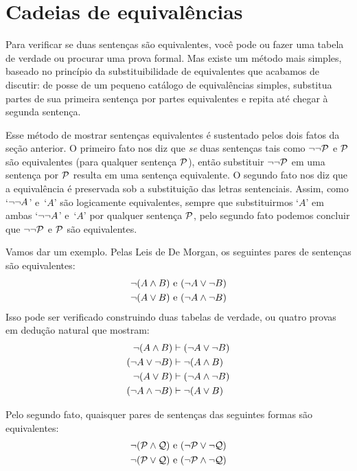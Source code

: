 \section{Cadeias de equivalências}

Para verificar se duas sentenças são equivalentes, você pode ou fazer uma tabela de verdade ou procurar uma prova formal. Mas existe um método mais simples, baseado no princípio da substituibilidade de equivalentes que acabamos de discutir: de posse de um pequeno catálogo de equivalências simples, substitua partes de sua primeira sentença por partes equivalentes e repita até chegar à segunda sentença.

Esse método de mostrar sentenças equivalentes é sustentado pelos dois fatos da seção anterior. O primeiro fato nos diz que \emph{se} duas sentenças tais como $\neg\neg \mathcal{P}$ e $\mathcal{P}$ são equivalentes (para qualquer sentença $\mathcal{P}$), então substituir $\neg\neg \mathcal{P}$ em uma sentença por $\mathcal{P}$ resulta em uma sentença equivalente. O segundo fato nos diz que  a equivalência é preservada sob a substituição das letras sentenciais.  Assim,  como `$\neg\neg A$' e~`$A$' são logicamente equivalentes,   sempre que substituirmos `$A$' em ambas `$\neg\neg A$' e~`$A$' por qualquer sentença $\mathcal{P}$, pelo  segundo fato podemos concluir que   $\neg\neg \mathcal{P}$ e $\mathcal{P}$ são equivalentes.

 

Vamos dar um exemplo. Pelas Leis de De Morgan, os seguintes pares de sentenças são equivalentes:
\begin{align*}
	\neg (A \wedge B) & \text{ e } (\neg A \vee \neg B)\\
	\neg (A \vee B) & \text{ e } (\neg A \wedge \neg B)
\end{align*}
Isso pode ser verificado construindo duas tabelas de verdade, ou quatro provas em dedução natural que mostram:
\begin{align*}
	\neg (A \wedge B) & \vdash (\neg A \vee \neg B)\\
	(\neg A \vee \neg B) & \vdash \neg (A \wedge B)\\
	\neg (A \vee B) & \vdash (\neg A \wedge \neg B)\\
	(\neg A \wedge \neg B) & \vdash \neg (A \vee B)
\end{align*}

Pelo segundo fato, quaisquer pares de sentenças das seguintes formas são equivalentes:
\begin{align*}
	\neg (\mathcal{P} \wedge \mathcal{Q}) & \text{ e } (\neg \mathcal{P} \vee \neg \mathcal{Q})\\
	\neg (\mathcal{P} \vee \mathcal{Q}) & \text{ e } (\neg \mathcal{P} \wedge \neg \mathcal{Q})
\end{align*}

